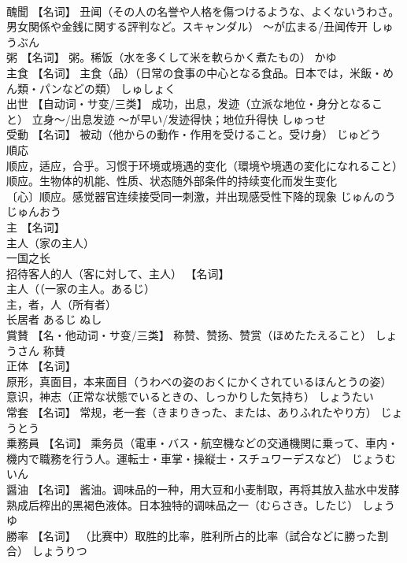\documentclass[8pt]{extreport}
\begin{document}
\begin{CJK}{UTF8}{min}
\\	醜聞	【名词】 丑闻（その人の名誉や人格を傷つけるような、よくないうわさ。男女関係や金銭に関する評判など。スキャンダル） ～が広まる/丑闻传开	しゅうぶん	
\\	粥	【名词】 粥。稀饭（水を多くして米を軟らかく煮たもの）	かゆ	
\\	主食	【名词】 主食（品）（日常の食事の中心となる食品。日本では，米飯・めん類・パンなどの類）	しゅしょく	
\\	出世	【自动词・サ变/三类】 成功，出息，发迹（立派な地位・身分となること） 立身～/出息发迹 ～が早い/发迹得快；地位升得快	しゅっせ	
\\	受動	【名词】 被动（他からの動作・作用を受けること。受け身）	じゅどう	
\\	順応	
\\	顺应，适应，合乎。习惯于环境或境遇的变化（環境や境遇の変化になれること） 
\\	顺应。生物体的机能、性质、状态随外部条件的持续变化而发生变化 
\\	〔心〕顺应。感觉器官连续接受同一刺激，并出现感受性下降的现象	じゅんのう じゅんおう	
\\	主	【名词】 
\\	主人（家の主人） 
\\	一国之长 
\\	招待客人的人（客に対して、主人） 【名词】 
\\	主人（（一家の主人。あるじ） 
\\	主，者，人（所有者） 
\\	长居者	あるじ ぬし	
\\	賞賛	【名・他动词・サ变/三类】 称赞、赞扬、赞赏（ほめたたえること）	しょうさん	称賛
\\	正体	【名词】 
\\	原形，真面目，本来面目（うわべの姿のおくにかくされているほんとうの姿） 
\\	意识，神志（正常な状態でいるときの、しっかりした気持ち）	しょうたい	
\\	常套	【名词】 常规，老一套（きまりきった、または、ありふれたやり方）	じょうとう	
\\	乗務員	【名词】 乘务员（電車・バス・航空機などの交通機関に乗って、車内・機内で職務を行う人。運転士・車掌・操縦士・スチュワーデスなど）	じょうむいん	
\\	醤油	【名词】 酱油。调味品的一种，用大豆和小麦制取，再将其放入盐水中发酵熟成后榨出的黑褐色液体。日本独特的调味品之一（むらさき。したじ）	しょうゆ	
\\	勝率	【名词】 （比赛中）取胜的比率，胜利所占的比率（試合などに勝った割合）	しょうりつ	

\end{CJK}
\end{document}
